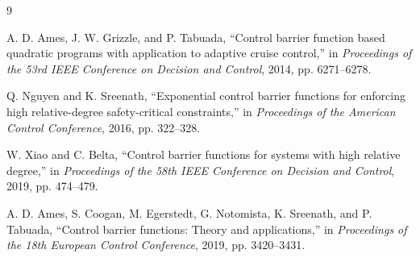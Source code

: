 \documentclass[11pt]{article}
\begin{document}
\begin{thebibliography}{9}

A. D. Ames, J. W. Grizzle, and P. Tabuada,
``Control barrier function based quadratic programs with application to adaptive cruise control,''
in \emph{Proceedings of the 53rd IEEE Conference on Decision and Control},
2014, pp. 6271--6278.

Q. Nguyen and K. Sreenath,
``Exponential control barrier functions for enforcing high relative-degree safety-critical constraints,''
in \emph{Proceedings of the American Control Conference},
2016, pp. 322--328.

W. Xiao and C. Belta,
``Control barrier functions for systems with high relative degree,''
in \emph{Proceedings of the 58th IEEE Conference on Decision and Control},
2019, pp. 474--479.

A. D. Ames, S. Coogan, M. Egerstedt, G. Notomista, K. Sreenath, and P. Tabuada,
``Control barrier functions: Theory and applications,''
in \emph{Proceedings of the 18th European Control Conference},
2019, pp. 3420--3431.

\end{thebibliography}
\end{document}
